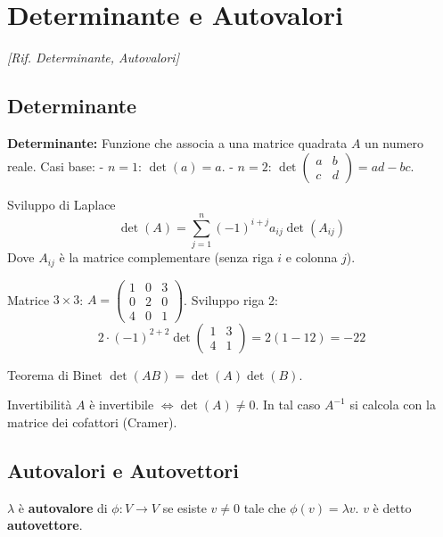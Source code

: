 \section{Determinante e Autovalori}
\emph{[Rif. Determinante, Autovalori]}

\subsection{Determinante}
\begin{definitionbox}
\textbf{Determinante:} Funzione che associa a una matrice quadrata $A$ un numero reale.
Casi base:
- $n=1$: $\det(a) = a$.
- $n=2$: $\det \begin{pmatrix} a & b \\ c & d \end{pmatrix} = ad - bc$.
\end{definitionbox}

\begin{concept}{Sviluppo di Laplace}
$$ \det(A) = \sum_{j=1}^n (-1)^{i+j} a_{ij} \det(A_{ij}) $$
Dove $A_{ij}$ è la matrice complementare (senza riga $i$ e colonna $j$).
\end{concept}

\begin{exercisebox}[title={Esempio Calcolo}]
Matrice $3 \times 3$:
$A = \begin{pmatrix} 1 & 0 & 3 \\ 0 & 2 & 0 \\ 4 & 0 & 1 \end{pmatrix}$.
Sviluppo riga 2:
$$ 2 \cdot (-1)^{2+2} \det \begin{pmatrix} 1 & 3 \\ 4 & 1 \end{pmatrix} = 2(1 - 12) = -22 $$
\end{exercisebox}

\begin{concept}{Teorema di Binet}
$\det(AB) = \det(A)\det(B)$.
\end{concept}

\begin{concept}{Invertibilità}
$A$ è invertibile $\iff \det(A) \neq 0$.
In tal caso $A^{-1}$ si calcola con la matrice dei cofattori (Cramer).
\end{concept}

\subsection{Autovalori e Autovettori}
\begin{definitionbox}
$\lambda$ è \textbf{autovalore} di $\phi: V \to V$ se esiste $v \neq 0$ tale che $\phi(v) = \lambda v$.
$v$ è detto \textbf{autovettore}.
\end{definitionbox}

